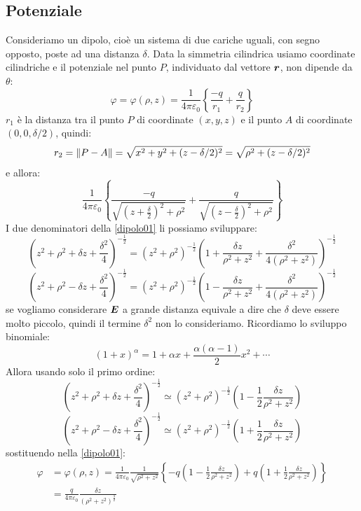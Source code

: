 \subsection{Potenziale}
Consideriamo un dipolo, cioè un sistema di due cariche uguali, con segno opposto, poste ad una distanza $\delta$. Data la simmetria cilindrica usiamo coordinate cilindriche e il potenziale nel punto $P$, individuato dal vettore $\boldsymbol{r}$, non dipende da $\theta$:
\begin{equation}
  \varphi=\varphi(\rho,z)=\frac{1}{4\pi\varepsilon_0}\left\{\frac{-q}{r_1}+\frac{q}{r_2}\right\}
\end{equation}
$r_1$ è la distanza tra il punto $P$ di coordinate $(x,y,z)$ e il punto $A$ di coordinate $(0,0,\delta/2)$, quindi:
\[
  r_2 = \left\lVert P-A\right\rVert = \sqrt{x^2+y^2+(z-\delta/2)^2}=\sqrt{\rho^2+(z-\delta/2)^2}
\]
e allora:
\begin{equation}
  \frac{1}{4\pi\varepsilon_0}\left\{\frac{-q}{\sqrt{\left(z+\frac{\delta}{2}\right)^2+\rho^2}}+\frac{q}{\sqrt{\left(z-\frac{\delta}{2}\right)^2+\rho^2}}\right\}
  \label{dipolo01}
\end{equation}
I due denominatori della \eqref{dipolo01} li possiamo sviluppare:
\[\left(z^2+\rho^2+\delta z+\frac{\delta^2}{4}\right)^{-\frac{1}{2}}=\left(z^2+\rho^2\right)^{-\frac{1}{2}}\left(1+\frac{\delta z}{\rho^2+z^2}+\frac{\delta^2}{4\left(\rho^2+z^2\right)}\right)^{-\frac{1}{2}}\]
\[\left(z^2+\rho^2-\delta z+\frac{\delta ^2}{4}\right)^{-\frac{1}{2}}=\left(z^2+\rho^2\right)^{-\frac{1}{2}}\left(1-\frac{\delta z}{\rho^2+z^2}+\frac{\delta^2}{4\left(\rho^2+z^2\right)}\right)^{-\frac{1}{2}}\]
se vogliamo considerare $\boldsymbol{E}$ a grande distanza equivale a dire che $\delta$ deve essere molto piccolo, quindi il termine $\delta^2$ non lo consideriamo. Ricordiamo lo sviluppo binomiale:
\[\left(1+x\right)^\alpha=1+\alpha x+\frac{\alpha\left(\alpha-1\right)}{2}x^2+\cdots\]
Allora usando solo il primo ordine:
\[\left(z^2+\rho^2+\delta z+\frac{\delta^2}{4}\right)^{-\frac{1}{2}}\simeq\left(z^2+\rho^2\right)^{-\frac{1}{2}}\left(1-\frac{1}{2}\frac{\delta z}{\rho^2+z^2}\right)\]
\[\left(z^2+\rho^2-\delta z+\frac{\delta^2}{4}\right)^{-\frac{1}{2}}\simeq\left(z^2+\rho^2\right)^{-\frac{1}{2}}\left(1+\frac{1}{2}\frac{\delta z}{\rho^2+z^2}\right)\]
sostituendo nella \eqref{dipolo01}:
\begin{align*}
  \varphi & =\varphi(\rho,z)=\frac{1}{4\pi\varepsilon_0}\frac{1}{\sqrt{\rho^2+z^2}}\left\{-q\left(1-\frac{1}{2}\frac{\delta z}{\rho^2+z^2}\right)+q\left(1+\frac{1}{2}\frac{\delta z}{\rho^2+z^2}\right)\right\} \\
          & =\frac{q}{4\pi\varepsilon_0}\frac{\delta z}{\left(\rho^2+z^2\right)^\frac{3}{2}}
\end{align*}
